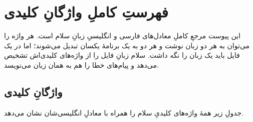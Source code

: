 \chapter{فهرستِ کاملِ واژگانِ کلیدی}%
\label{app:keywords}
\pagestyle{keywordsappendix}

این پیوست مرجعِ کاملِ معادل‌های فارسی و انگلیسیِ زبانِ سلام است. هر واژه را
می‌توان به هر دو زبان نوشت و هر دو به یک برنامهٔ یکسان تبدیل می‌شوند؛ اما در یک
فایل باید یک زبان را نگه داشت. سلام زبانِ فایل را از واژه‌های کلیدی‌اش تشخیص
می‌دهد و پیام‌های خطا را هم به همان زبان می‌نویسد.

\section{واژگانِ کلیدی}

جدولِ زیر همهٔ واژه‌های کلیدیِ سلام را همراه با معادلِ انگلیسی‌شان نشان می‌دهد.

